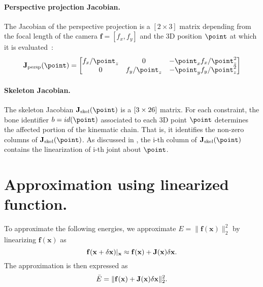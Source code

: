 \paragraph*{Perspective projection Jacobian.} 
The  Jacobian of the perspective projection is a $[2\times3]$ matrix depending from the focal length of the camera $\mathbf{f}=[f_x, f_y]$ and the 3D position $\point$ at which it is evaluated~\cite{Bouaziz_eg2014}:
\begin{equation*}
    \Jproj(\point) = 
    \left[
    \begin{matrix}
        f_x/\point_z & 0   & -\point_x f_x / \point_z^2 \\
        0   & f_y/\point_z & -\point_y f_y / \point_z^2 \\
    \end{matrix}
    \right]
\end{equation*}
% 
% 
%  
% 
%  
\paragraph*{Skeleton Jacobian.} The skeleton Jacobian $\Jskel(\point)$ is a $[3\times26]$ matrix. For each constraint, the bone identifier $b=id(\point)$ associated to each 3D point $\point$ determines the affected portion of the kinematic chain. That is, it identifies the non-zero columns of $\Jskel(\point)$. As discussed in \cite{buss_04}, the i-th column of $\Jskel(\point)$ contains the linearization of i-th joint about $\point$.
% 
% 
%  
% 
%  
\vspace{-.15in}
\section{Approximation using linearized function.}
\label{app:linfunction}
To approximate the following energies, we approximate $E=\|\mathbf{f}(\mathbf{x})\|_2^2$ by linearizing $\mathbf{f}(\mathbf{x})$ as
\begin{equation*}
\mathbf{f}(\mathbf{x}+\delta\mathbf{x})|_{\mathbf{x}} \approx \mathbf{f}(\mathbf{x}) + \mathbf{J}(\mathbf{x})\delta\mathbf{x}.
\end{equation*}
The approximation is then expressed as 
\begin{equation}
\label{eq:linearization}
\bar{E} = \|\mathbf{f}(\mathbf{x}) + \mathbf{J}(\mathbf{x})\delta\mathbf{x}\|_2^2.
\end{equation}
